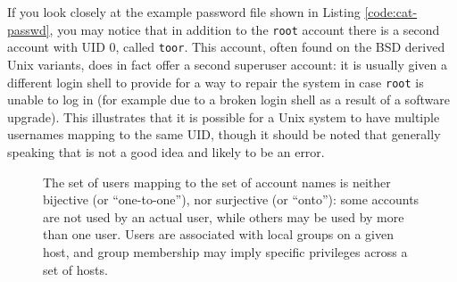 If you look closely at the example password file shown
in Listing \ref{code:cat-passwd}, you may notice that
in addition to the {\tt root} account there is a
second account with UID 0, called {\tt toor}. This
account, often found on the BSD derived Unix variants,
does in fact offer a second superuser account: it is
usually given a different login shell to provide for a
way to repair the system in case {\tt root} is unable
to log in (for example due to a broken login shell as
a result of a software upgrade).  This illustrates
that it is possible for a Unix system to have multiple
usernames mapping to the same UID, though it should be
noted that generally speaking that is not a good idea
and likely to be an error.

\begin{figure}[!hb]
	\centering
	\caption[User Mappings]{The set of users mapping to the
			set of account names is neither bijective (or
			``one-to-one''), nor surjective (or ``onto''):
			some accounts are not used by an actual user,
			while others may be used by more than one user.
			Users are associated with local groups on a given
			host, and group membership may imply specific
			privileges across a set of hosts.
			\label{fig:multi-user:mappings}}
\end{figure}



